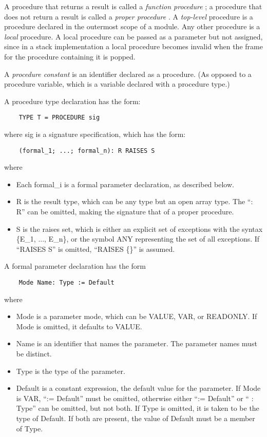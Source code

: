 \documentclass[10pt]{article}
\begin{document}
A procedure that returns a result is called a \emph{function procedure} ; a
procedure that does not return a result is called a \emph{proper procedure}
.  A \emph{top-level} procedure is a procedure declared in the outermost scope
of a module.  Any other procedure is a \emph{local} procedure.  A local
procedure can be passed as a parameter but not assigned, since in a stack
implementation a local procedure becomes invalid when the frame for the
procedure containing it is popped.

A \emph{procedure constant} is an identifier declared as a procedure.  (As
opposed to a procedure variable, which is a variable declared with a procedure
type.)

A procedure type declaration has the form:
\begin{verbatim}
    TYPE T = PROCEDURE sig
\end{verbatim}
where sig is a signature specification, which has the form:
\begin{verbatim}
    (formal_1; ...; formal_n): R RAISES S
\end{verbatim}
where
\begin{itemize}
\item  Each formal\_i is a formal parameter declaration, as described below.
\item R is the result type, which can be any type but an open array type.  The ``: R'' can be omitted, making the signature that of a proper procedure.
\item S is the raises set, which is either an explicit set of exceptions with
  the syntax \{E\_1, ..., E\_n\}, or the symbol ANY representing the set of
  all exceptions.  If ``RAISES S'' is omitted, ``RAISES \{\}'' is assumed.
\end{itemize}

A formal parameter declaration has the form
\begin{verbatim}
    Mode Name: Type := Default
\end{verbatim}
where
\begin{itemize}
\item Mode is a parameter mode, which can be VALUE, VAR, or READONLY.  If Mode
  is omitted, it defaults to VALUE.
\item Name is an identifier that names the parameter.  The parameter names must
  be distinct.
\item Type is the type of the parameter.
\item Default is a constant expression, the default value for the
  parameter.  If Mode is VAR, ``:= Default'' must be omitted, otherwise either
  ``:= Default'' or `` : Type'' can be omitted, but not both.  If Type is
  omitted, it is taken to be the type of Default.  If both are present, the
  value of Default must be a member of Type.
\end{itemize}
\end{document}

